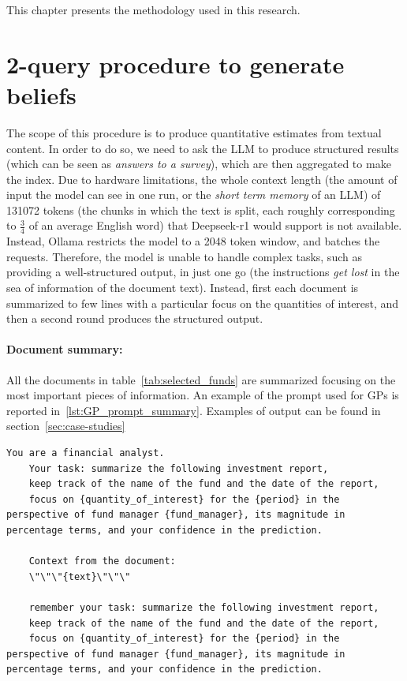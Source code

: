 This chapter presents the methodology used in this research.

\section{2-query procedure to generate beliefs}\label{sec:how-to-generate-beliefs-using-llms}
The scope of this procedure is to produce quantitative estimates from textual content.
In order to do so, we need to ask the LLM to produce structured results (which can be seen as \textit{answers to a survey}), which are then aggregated to make the index.
Due to hardware limitations, the whole context length (the amount of input the model can see in one run, or the \textit{short term memory} of an LLM) of 131072 tokens (the chunks in which the text is split, each roughly corresponding to $\frac{3}{4}$ of an average English word) that Deepseek-r1 would support is not available.
Instead, Ollama restricts the model to a 2048 token window, and batches the requests.
Therefore, the model is unable to handle complex tasks, such as providing a well-structured output, in just one go (the instructions \textit{get lost} in the sea of information of the document text).
Instead, first each document is summarized to few lines with a particular focus on the quantities of interest, and then a second round produces the structured output.

\paragraph{Document summary:} All the documents in table~\ref{tab:selected_funds} are summarized focusing on the most important pieces of information.
An example of the prompt used for GPs is reported in~\ref{lst:GP_prompt_summary}.
Examples of output can be found in section~\ref{sec:case-studies}

\begin{lstlisting}[style= cmd,label={lst:GP_prompt_summary}]
    You are a financial analyst.
    Your task: summarize the following investment report,
    keep track of the name of the fund and the date of the report,
    focus on {quantity_of_interest} for the {period} in the perspective of fund manager {fund_manager}, its magnitude in percentage terms, and your confidence in the prediction.

    Context from the document:
    \"\"\"{text}\"\"\"

    remember your task: summarize the following investment report,
    keep track of the name of the fund and the date of the report,
    focus on {quantity_of_interest} for the {period} in the perspective of fund manager {fund_manager}, its magnitude in percentage terms, and your confidence in the prediction.
\end{lstlisting}

